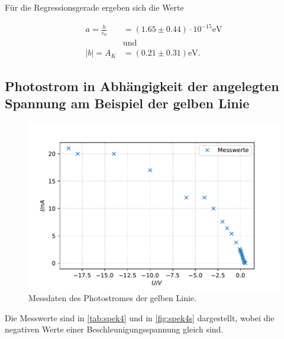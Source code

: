Für die Regressionsgerade ergeben sich die Werte

\begin{align}
  a = \frac{h}{e_0} &= (1.65 ± 0.44) \cdot 10^{-15} \unit{\eV} \\
  &\text{und} \\
  |b| = A_K &= (0.21 ±  0.31) \unit{\eV}.
\end{align}

\subsection{Photostrom in Abhängigkeit der angelegten Spannung am Beispiel der gelben Linie}
\begin{figure}
  \center
  \caption{Messdaten des Photostromes der gelben Linie.}\label{fig:spek4s}
  \includegraphics[width=0.8\linewidth]{pictures/spek4s.pdf}
\end{figure}

Die Messwerte sind in \autoref{tab:spek4} und in \autoref{fig:spek4s} dargestellt, wobei die negativen Werte einer Beschleunigungsspannung gleich sind.